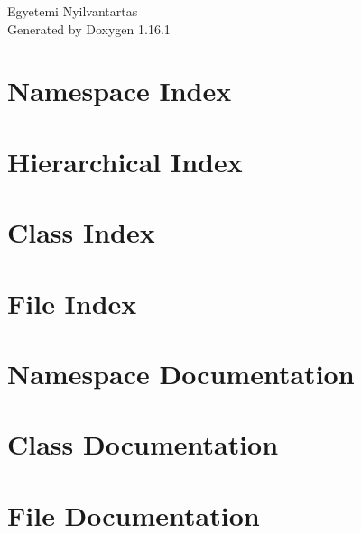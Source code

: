 \documentclass[twoside]{book}
\newcommand{\+}{\discretionary{\mbox{\scriptsize$\hookleftarrow$}}{}{}}
\newcommand{\clearemptydoublepage}{%
    \newpage{\pagestyle{empty}\cleardoublepage}%
  }
\begin{document}
  \raggedbottom
    \hypersetup{pageanchor=false,
                bookmarksnumbered=true,
                pdfencoding=unicode
               }
  \begin{titlepage}
  \vspace*{7cm}
  \begin{center}%
  {\Large Egyetemi Nyilvantartas}\\
  \vspace*{1cm}
  {\large Generated by Doxygen 1.16.1}\\
  \end{center}
  \end{titlepage}
  \clearemptydoublepage
  \tableofcontents
  \clearemptydoublepage
  \hypersetup{pageanchor=true}
\chapter{Namespace Index}

\chapter{Hierarchical Index}

\chapter{Class Index}

\chapter{File Index}

\chapter{Namespace Documentation}

\chapter{Class Documentation}








\chapter{File Documentation}













  \backmatter
  \newpage
  \clearemptydoublepage
  \printindex
\end{document}
